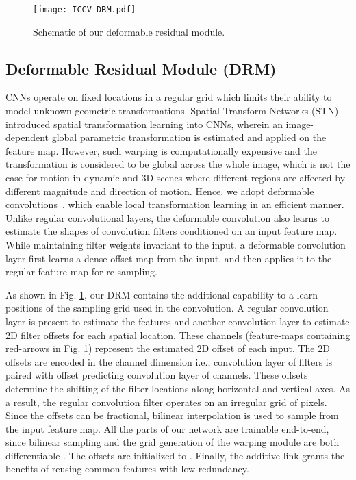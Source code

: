 \documentclass[10pt,twocolumn,letterpaper]{article}
\begin{document}
\begin{figure}[]
\centering
\texttt{[image: ICCV\_DRM.pdf]}\caption{Schematic of our deformable residual module.}
\label{fig:deformableblock}
\end{figure}


\subsection{Deformable Residual Module (DRM)}
CNNs operate on fixed locations in a regular grid which limits their ability to model unknown geometric transformations. Spatial Transform Networks (STN) \cite{jaderberg2015spatial} introduced spatial transformation learning into CNNs, wherein an image-dependent global parametric transformation is estimated and applied on the feature map. However, such warping is computationally expensive and the transformation is considered to be global across the whole image, which is not the case for motion in dynamic and 3D scenes where different regions are affected by different magnitude and direction of motion. Hence, we adopt deformable convolutions~\cite{dai2017deformable}, which enable local transformation learning in an efficient manner. Unlike regular convolutional layers, the deformable convolution\cite{dai2017deformable} also learns to estimate the shapes of convolution filters conditioned on an input feature map. While maintaining filter weights invariant to the input, a deformable convolution layer first learns a dense offset map from the input, and then applies it to the regular feature map for re-sampling.

As shown in Fig. \ref{fig:deformableblock}, our DRM contains the additional capability to a learn positions of the sampling grid used in the convolution. A regular convolution layer is present to estimate the features and another convolution layer to estimate 2D filter offsets for each spatial location. These channels (feature-maps containing red-arrows in Fig. \ref{fig:deformableblock}) represent the estimated 2D offset of each input. The 2D offsets are encoded in the channel dimension i.e., convolution layer of  filters is paired with offset predicting convolution layer of  channels. These offsets determine the shifting of the  filter locations along horizontal and vertical axes. As a result, the regular convolution filter operates on an irregular grid of pixels. Since the offsets can be fractional, bilinear interpolation is used to sample from the input feature map. All the parts of our network are trainable end-to-end, since bilinear sampling and the grid generation of the warping module are both differentiable \cite{paszke2017automatic}. The offsets are initialized to . Finally, the additive link grants the benefits of reusing common features with low redundancy.
\end{document}
